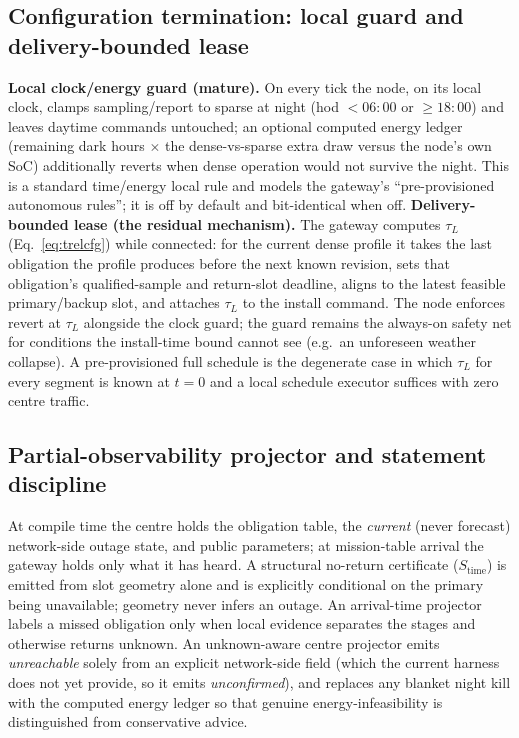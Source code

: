 \documentclass[11pt]{article}
\newcommand{\stime}{$S_{\mathrm{time}}$\xspace}
\begin{document}
\subsection{Configuration termination: local guard and delivery-bounded lease}
\label{sec:mech-lease}
\textbf{Local clock/energy guard (mature).} On every tick the node, on its local clock, clamps
sampling/report to sparse at night (hod $<06{:}00$ or $\geq18{:}00$) and leaves daytime commands
untouched; an optional computed energy ledger (remaining dark hours $\times$ the dense-vs-sparse
extra draw versus the node's own SoC) additionally reverts when dense operation would not survive
the night. This is a standard time/energy local rule and models the gateway's ``pre-provisioned
autonomous rules''; it is off by default and bit-identical when off.
\textbf{Delivery-bounded lease (the residual mechanism).} The gateway computes $\tau_L$
(Eq.~\ref{eq:trelcfg}) while connected: for the current dense profile it takes the last obligation
the profile produces before the next known revision, sets that obligation's qualified-sample and
return-slot deadline, aligns to the latest feasible primary/backup slot, and attaches $\tau_L$ to
the install command. The node enforces revert at $\tau_L$ alongside the clock guard; the guard
remains the always-on safety net for conditions the install-time bound cannot see (e.g.\ an
unforeseen weather collapse). A pre-provisioned full schedule is the degenerate case in which
$\tau_L$ for every segment is known at $t{=}0$ and a local schedule executor suffices with zero
centre traffic.

\subsection{Partial-observability projector and statement discipline}
\label{sec:mech-projector}
At compile time the centre holds the obligation table, the \emph{current} (never forecast)
network-side outage state, and public parameters; at mission-table arrival the gateway holds only
what it has heard. A structural no-return certificate (\stime) is emitted from slot geometry alone
and is explicitly conditional on the primary being unavailable; geometry never infers an outage.
An arrival-time projector labels a missed obligation only when local evidence separates the stages
and otherwise returns unknown. An unknown-aware centre projector emits \emph{unreachable} solely
from an explicit network-side field (which the current harness does not yet provide, so it emits
\emph{unconfirmed}), and replaces any blanket night kill with the computed energy ledger so that
genuine energy-infeasibility is distinguished from conservative advice.
\end{document}
